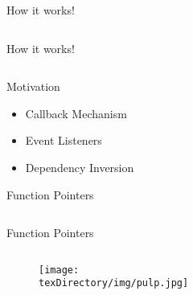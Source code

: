 \documentclass[compress]{beamer}
\begin{document}
\begin{slide}
	\begin{block}{How it works!}

	\inputminted[fontsize=\footnotesize, firstline=10, lastline=20, linenos]{c}{
		\resDirectory/ptrfunc1.c
	}

	\end{block}
\end{slide}

\begin{slide}
	\begin{block}{How it works!}

	\inputminted[fontsize=\footnotesize, firstline=22, linenos]{c}{
		\resDirectory/ptrfunc1.c
	}

	\end{block}
\end{slide}

\begin{slide}
	\begin{block}{Motivation}

	\begin{itemize}
	\item[] Callback Mechanism
	\item[] Event Listeners
	\item[] Dependency Inversion
	\end{itemize}

	\end{block}
\end{slide}

\begin{slide}
	\begin{block}{Function Pointers}

	\inputminted[fontsize=\footnotesize, firstline=10, lastline=20, linenos]{c}{
		\resDirectory/ptrfunc2.c
	}

	\end{block}
\end{slide}

\begin{slide}
	\begin{block}{Function Pointers}

	\inputminted[fontsize=\footnotesize, firstline=22, linenos]{c}{
		\resDirectory/ptrfunc2.c
	}

	\end{block}
\end{slide}

\begin{slide}
	\begin{figure}
	\texttt{[image: \\texDirectory/img/pulp.jpg]}
	\end{figure}
\end{slide}
\end{document}
